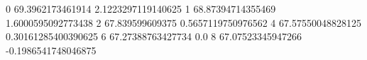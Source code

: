 0 69.3962173461914 2.1223297119140625
1 68.87394714355469 1.6000595092773438
2 67.839599609375 0.5657119750976562
4 67.57550048828125 0.30161285400390625
6 67.27388763427734 0.0
8 67.07523345947266 -0.1986541748046875
